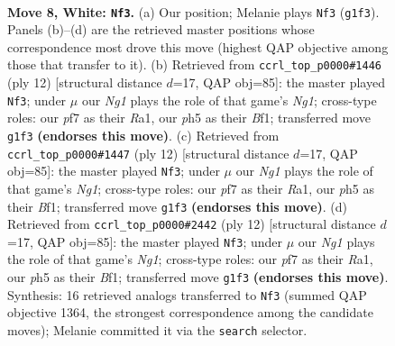 \documentclass[11pt]{article}
\begin{document}
\begin{figure}[p]\centering
\begin{subfigure}{0.46\textwidth}\centering
\resizebox{\linewidth}{!}{%
\newchessgame
\chessboard[
  setfen={rnbqk2r/ppp1ppb1/6p1/7p/2BPP3/2P5/P4PPP/R1BQK1NR w KQkq - 0 8},
  showmover=false,
  pgfstyle=straightmove, color=movearrow, markmove={g1-f3}
]}
\caption{}
\end{subfigure}\hfill
\begin{subfigure}{0.46\textwidth}\centering
\resizebox{\linewidth}{!}{%
\newchessgame
\chessboard[
  setfen={rnbqk2r/ppp1ppbp/6p1/8/3PP3/2P5/P4PPP/R1BQKBNR w KQkq - 1 7},
  showmover=false,
  pgfstyle=straightmove, color=movearrow, markmove={g1-f3}
]}
\caption{}
\end{subfigure}
\\[4pt]
\begin{subfigure}{0.46\textwidth}\centering
\resizebox{\linewidth}{!}{%
\newchessgame
\chessboard[
  setfen={rnbqk2r/ppp1ppbp/6p1/8/3PP3/2P5/P4PPP/R1BQKBNR w KQkq - 1 7},
  showmover=false,
  pgfstyle=straightmove, color=movearrow, markmove={g1-f3}
]}
\caption{}
\end{subfigure}\hfill
\begin{subfigure}{0.46\textwidth}\centering
\resizebox{\linewidth}{!}{%
\newchessgame
\chessboard[
  setfen={rnbqk2r/ppp1ppbp/6p1/8/3PP3/2P5/P4PPP/R1BQKBNR w KQkq - 1 7},
  showmover=false,
  pgfstyle=straightmove, color=movearrow, markmove={g1-f3}
]}
\caption{}
\end{subfigure}
\caption{\textbf{Move 8, White: \texttt{Nf3}.} (a) Our position; Melanie plays \texttt{Nf3} (\texttt{g1f3}). Panels (b)--(d) are the retrieved master positions whose correspondence most drove this move (highest QAP objective among those that transfer to it). (b) Retrieved from \texttt{ccrl\_top\_p0000\#1446} (ply 12) [structural distance $d$=17, QAP obj=85]: the master played \texttt{Nf3}; under $\mu$ our \emph{Ng1} plays the role of that game's \emph{Ng1}; cross-type roles: our \emph{p}f7 as their \emph{R}a1, our \emph{p}h5 as their \emph{B}f1; transferred move \texttt{g1f3} \textbf{(endorses this move)}. (c) Retrieved from \texttt{ccrl\_top\_p0000\#1447} (ply 12) [structural distance $d$=17, QAP obj=85]: the master played \texttt{Nf3}; under $\mu$ our \emph{Ng1} plays the role of that game's \emph{Ng1}; cross-type roles: our \emph{p}f7 as their \emph{R}a1, our \emph{p}h5 as their \emph{B}f1; transferred move \texttt{g1f3} \textbf{(endorses this move)}. (d) Retrieved from \texttt{ccrl\_top\_p0000\#2442} (ply 12) [structural distance $d$=17, QAP obj=85]: the master played \texttt{Nf3}; under $\mu$ our \emph{Ng1} plays the role of that game's \emph{Ng1}; cross-type roles: our \emph{p}f7 as their \emph{R}a1, our \emph{p}h5 as their \emph{B}f1; transferred move \texttt{g1f3} \textbf{(endorses this move)}. Synthesis: 16 retrieved analogs transferred to \texttt{Nf3} (summed QAP objective 1364, the strongest correspondence among the candidate moves); Melanie committed it via the \texttt{search} selector.}
\label{fig:thought-m14}
\end{figure}
\end{document}
